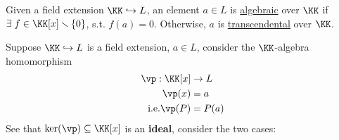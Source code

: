 \begin{definition}
	Given a field extension \( \KK \hookrightarrow L \), an element \( a\in L \) is
	\underline{algebraic} over \( \KK \) if \( \exists \; f \in \KK[x] \smallsetminus \{0\} \), s.t.
	\( f(a) = 0 \). Otherwise, \( a \) is \underline{transcendental} over \( \KK \).
\end{definition}
Suppose \( \KK \hookrightarrow L \) is a field extension, \( a\in L \), consider the \( \KK
\)-algebra homomorphism
\[
	\begin{aligned}
		\vp: \KK[x]        & \to L  \\
		\vp(x)             & = a    \\
		\text{i.e.} \vp(P) & = P(a)
	\end{aligned}
\]
See that \( \ker(\vp) \subseteq \KK[x] \) is an \textbf{ideal}, consider the two cases:
